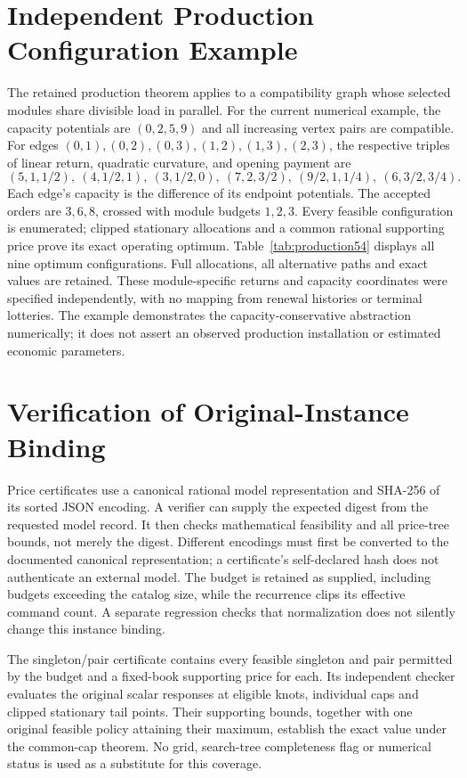 \section{Independent Production Configuration Example}
The retained production theorem applies to a compatibility graph whose selected modules share divisible load in parallel. For the current numerical example, the capacity potentials are $(0,2,5,9)$ and all increasing vertex pairs are compatible. For edges $(0,1),(0,2),(0,3),(1,2),(1,3),(2,3)$, the respective triples of linear return, quadratic curvature, and opening payment are
\[
 (5,1,1/2),\ (4,1/2,1),\ (3,1/2,0),\ (7,2,3/2),\ (9/2,1,1/4),\ (6,3/2,3/4).
\]
Each edge's capacity is the difference of its endpoint potentials. The accepted orders are $3,6,8$, crossed with module budgets $1,2,3$. Every feasible configuration is enumerated; clipped stationary allocations and a common rational supporting price prove its exact operating optimum. Table~\ref{tab:production54} displays all nine optimum configurations. Full allocations, all alternative paths and exact values are retained. These module-specific returns and capacity coordinates were specified independently, with no mapping from renewal histories or terminal lotteries. The example demonstrates the capacity-conservative abstraction numerically; it does not assert an observed production installation or estimated economic parameters.

\section{Verification of Original-Instance Binding}
Price certificates use a canonical rational model representation and SHA-256 of its sorted JSON encoding. A verifier can supply the expected digest from the requested model record. It then checks mathematical feasibility and all price-tree bounds, not merely the digest. Different encodings must first be converted to the documented canonical representation; a certificate's self-declared hash does not authenticate an external model. The budget is retained as supplied, including budgets exceeding the catalog size, while the recurrence clips its effective command count. A separate regression checks that normalization does not silently change this instance binding.

The singleton/pair certificate contains every feasible singleton and pair permitted by the budget and a fixed-book supporting price for each. Its independent checker evaluates the original scalar responses at eligible knots, individual caps and clipped stationary tail points. Their supporting bounds, together with one original feasible policy attaining their maximum, establish the exact value under the common-cap theorem. No grid, search-tree completeness flag or numerical status is used as a substitute for this coverage.
